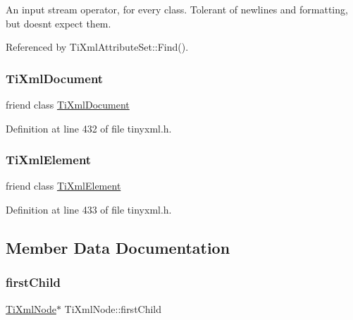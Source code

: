 An input stream operator, for every class. Tolerant of newlines and formatting, but doesn\textquotesingle{}t expect them. 

Referenced by Ti\+Xml\+Attribute\+Set\+::\+Find().

\hypertarget{class_ti_xml_node_a173617f6dfe902cf484ce5552b950475}{}\label{class_ti_xml_node_a173617f6dfe902cf484ce5552b950475} 
\subsubsection{\texorpdfstring{Ti\+Xml\+Document}{TiXmlDocument}}
{\footnotesize\ttfamily friend class \hyperlink{class_ti_xml_document}{Ti\+Xml\+Document}\hspace{0.3cm}{\ttfamily [friend]}}



Definition at line 432 of file tinyxml.\+h.

\hypertarget{class_ti_xml_node_ab6592e32cb9132be517cc12a70564c4b}{}\label{class_ti_xml_node_ab6592e32cb9132be517cc12a70564c4b} 
\subsubsection{\texorpdfstring{Ti\+Xml\+Element}{TiXmlElement}}
{\footnotesize\ttfamily friend class \hyperlink{class_ti_xml_element}{Ti\+Xml\+Element}\hspace{0.3cm}{\ttfamily [friend]}}



Definition at line 433 of file tinyxml.\+h.



\subsection{Member Data Documentation}
\hypertarget{class_ti_xml_node_af749fb7f22010b80e8f904c32653d50e}{}\label{class_ti_xml_node_af749fb7f22010b80e8f904c32653d50e} 
\subsubsection{\texorpdfstring{first\+Child}{firstChild}}
{\footnotesize\ttfamily \hyperlink{class_ti_xml_node}{Ti\+Xml\+Node}$\ast$ Ti\+Xml\+Node\+::first\+Child\hspace{0.3cm}{\ttfamily [protected]}}



